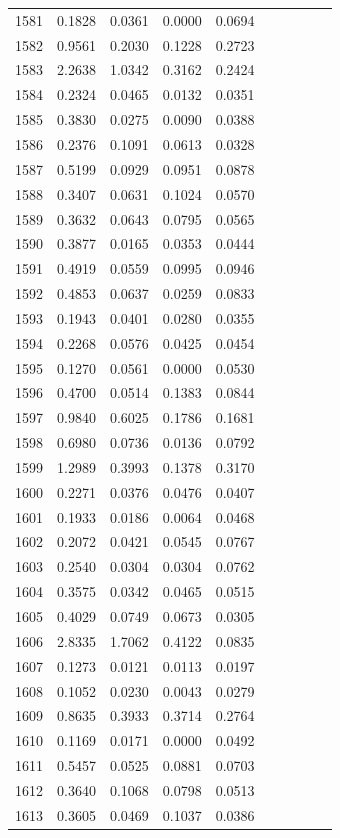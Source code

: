\begin{table}
\begin{tabular}{cccccccccc}
1581& 0.1828& 0.0361& 0.0000& 0.0694\\ 
1582& 0.9561& 0.2030& 0.1228& 0.2723\\ 
1583& 2.2638& 1.0342& 0.3162& 0.2424\\ 
1584& 0.2324& 0.0465& 0.0132& 0.0351\\ 
1585& 0.3830& 0.0275& 0.0090& 0.0388\\ 
1586& 0.2376& 0.1091& 0.0613& 0.0328\\ 
1587& 0.5199& 0.0929& 0.0951& 0.0878\\ 
1588& 0.3407& 0.0631& 0.1024& 0.0570\\ 
1589& 0.3632& 0.0643& 0.0795& 0.0565\\ 
1590& 0.3877& 0.0165& 0.0353& 0.0444\\ 
1591& 0.4919& 0.0559& 0.0995& 0.0946\\ 
1592& 0.4853& 0.0637& 0.0259& 0.0833\\ 
1593& 0.1943& 0.0401& 0.0280& 0.0355\\ 
1594& 0.2268& 0.0576& 0.0425& 0.0454\\ 
1595& 0.1270& 0.0561& 0.0000& 0.0530\\ 
1596& 0.4700& 0.0514& 0.1383& 0.0844\\ 
1597& 0.9840& 0.6025& 0.1786& 0.1681\\ 
1598& 0.6980& 0.0736& 0.0136& 0.0792\\ 
1599& 1.2989& 0.3993& 0.1378& 0.3170\\ 
1600& 0.2271& 0.0376& 0.0476& 0.0407\\ 
1601& 0.1933& 0.0186& 0.0064& 0.0468\\ 
1602& 0.2072& 0.0421& 0.0545& 0.0767\\ 
1603& 0.2540& 0.0304& 0.0304& 0.0762\\ 
1604& 0.3575& 0.0342& 0.0465& 0.0515\\ 
1605& 0.4029& 0.0749& 0.0673& 0.0305\\ 
1606& 2.8335& 1.7062& 0.4122& 0.0835\\ 
1607& 0.1273& 0.0121& 0.0113& 0.0197\\ 
1608& 0.1052& 0.0230& 0.0043& 0.0279\\ 
1609& 0.8635& 0.3933& 0.3714& 0.2764\\ 
1610& 0.1169& 0.0171& 0.0000& 0.0492\\ 
1611& 0.5457& 0.0525& 0.0881& 0.0703\\ 
1612& 0.3640& 0.1068& 0.0798& 0.0513\\ 
1613& 0.3605& 0.0469& 0.1037& 0.0386\\ 

\end{tabular}
\end{table}
